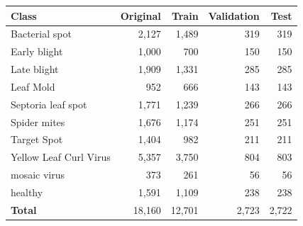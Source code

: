 \begin{tabular}{lrrrr}
\toprule
Class & Original & Train & Validation & Test \\
\midrule
Bacterial spot & 2,127 & 1,489 & 319 & 319 \\
Early blight & 1,000 & 700 & 150 & 150 \\
Late blight & 1,909 & 1,331 & 285 & 285 \\
Leaf Mold & 952 & 666 & 143 & 143 \\
Septoria leaf spot & 1,771 & 1,239 & 266 & 266 \\
Spider mites & 1,676 & 1,174 & 251 & 251 \\
Target Spot & 1,404 & 982 & 211 & 211 \\
Yellow Leaf Curl Virus & 5,357 & 3,750 & 804 & 803 \\
mosaic virus & 373 & 261 & 56 & 56 \\
healthy & 1,591 & 1,109 & 238 & 238 \\
\textbf{Total} & 18,160 & 12,701 & 2,723 & 2,722 \\
\bottomrule
\end{tabular}
